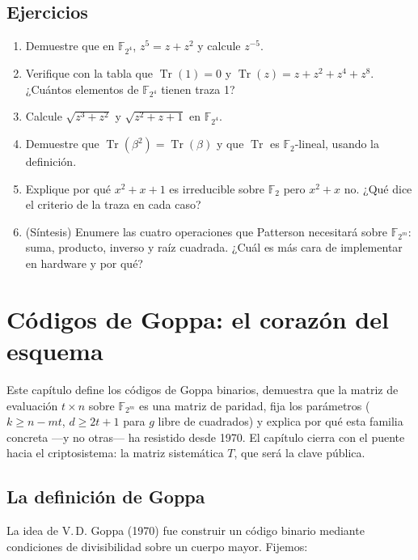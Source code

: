 \documentclass[11pt,a4paper,oneside]{report}
\newcommand{\F}{\mathbb{F}}
\newcommand{\GF}[1]{\mathbb{F}_{#1}}
\newcommand{\FF}[1]{\F_{2^{#1}}}
\DeclareMathOperator{\Tr}{Tr}
\begin{document}
\section{Ejercicios}

\begin{enumerate}[leftmargin=1.6em,itemsep=2pt]
  \item Demuestre que en $\FF4$, $z^5=z+z^2$ y calcule $z^{-5}$.
  \item Verifique con la tabla que $\Tr(1)=0$ y $\Tr(z)=z+z^2+z^4+z^8$.
        ¿Cuántos elementos de $\FF4$ tienen traza 1?
  \item Calcule $\sqrt{z^3+z^2}$ y $\sqrt{z^2+z+1}$ en $\FF4$.
  \item \label{ej:traza-ej} Demuestre que $\Tr(\beta^2)=\Tr(\beta)$ y que
        $\Tr$ es $\F_2$-lineal, usando la definición.
  \item Explique por qué $x^2+x+1$ es irreducible sobre $\F_2$ pero $x^2+x$
        no. ¿Qué dice el criterio de la traza en cada caso?
  \item \textnormal{(}Síntesis\textnormal{)} Enumere las cuatro operaciones
        que Patterson necesitará sobre $\FF{m}$: suma, producto,
        inverso y raíz cuadrada. ¿Cuál es más cara de implementar en
        hardware y por qué?
\end{enumerate}

\chapter{Códigos de Goppa: el corazón del esquema}\label{ch:goppa}

\begin{roadmap}
Este capítulo define los códigos de Goppa binarios, demuestra que la
matriz de evaluación $t\times n$ sobre $\GF{2^m}$ es una matriz de
paridad, fija los parámetros ($k\ge n-mt$, $d\ge 2t+1$ para $g$ libre de
cuadrados) y explica por qué esta familia concreta ---y no otras--- ha
resistido desde 1970. El capítulo cierra con el puente hacia el
criptosistema: la matriz sistemática $T$, que será la clave pública.
\end{roadmap}

\section{La definición de Goppa}

La idea de V.\,D. Goppa (1970) fue construir un código binario mediante
condiciones de divisibilidad sobre un cuerpo mayor. Fijemos:
\end{document}
